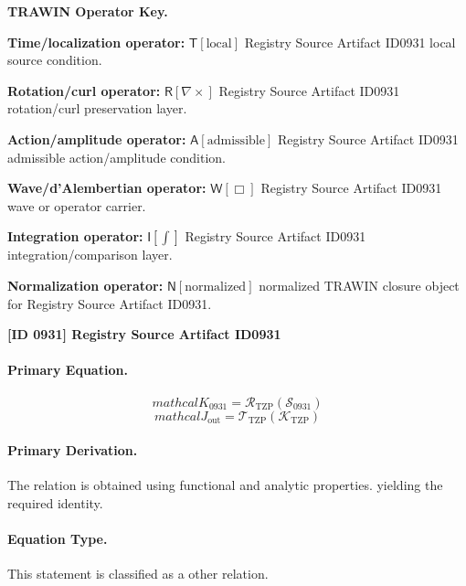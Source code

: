 \par\vspace{0.45\baselineskip}
\noindent\begin{minipage}[t]{\linewidth}
\begingroup
\small
\raggedright
\textbf{TRAWIN Operator Key.}\par
\noindent\textbf{Time/localization operator:} $\mathsf{T}\!\left[\mathrm{local}\right]$ Registry Source Artifact ID0931 local source condition.\par
\noindent\textbf{Rotation/curl operator:} $\mathsf{R}\!\left[\nabla\times\right]$ Registry Source Artifact ID0931 rotation/curl preservation layer.\par
\noindent\textbf{Action/amplitude operator:} $\mathsf{A}\!\left[\mathrm{admissible}\right]$ Registry Source Artifact ID0931 admissible action/amplitude condition.\par
\noindent\textbf{Wave/d'Alembertian operator:} $\mathsf{W}\!\left[\Box\right]$ Registry Source Artifact ID0931 wave or operator carrier.\par
\noindent\textbf{Integration operator:} $\mathsf{I}\!\left[\int\right]$ Registry Source Artifact ID0931 integration/comparison layer.\par
\noindent\textbf{Normalization operator:} $\mathsf{N}\!\left[\mathrm{normalized}\right]$ normalized TRAWIN closure object for Registry Source Artifact ID0931.\par
\endgroup
\end{minipage}

\clearpage
\noindent\textbf{[ID 0931] Registry Source Artifact ID0931}\par
\vspace{0.35em}
\paragraph{Primary Equation.}
\[
mathcal{K}_{0931}=\mathcal{R}_{\mathrm{TZP}}\!\left(\mathcal{S}_{0931}\right)
\]
\[
mathcal{J}_{\mathrm{out}} = \mathcal{T}_{\mathrm{TZP}}\!\left(\mathcal{K}_{\mathrm{TZP}}\right)
\]

\paragraph{Primary Derivation.}
The relation is obtained using functional and analytic properties. yielding the required identity.
\paragraph{Equation Type.}
This statement is classified as a other relation.


